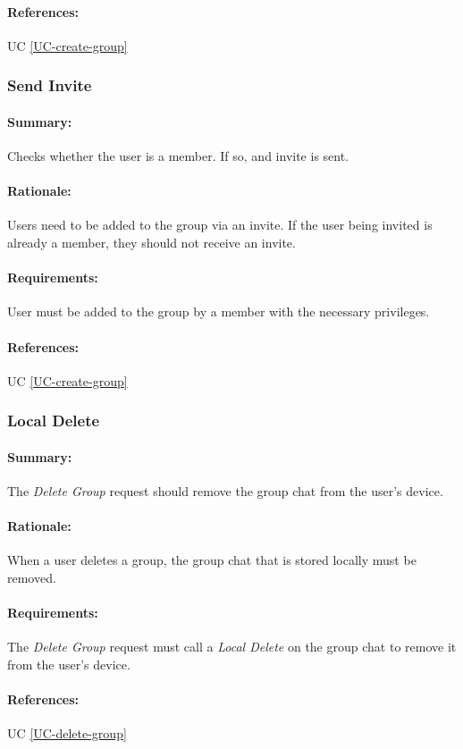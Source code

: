 \documentclass[11pt]{article}
\begin{document}
\paragraph{References:} UC \ref{UC-create-group}

\subsubsection{Send Invite} \label{FR-invite}
\paragraph{Summary:} Checks whether the user is a member. If so, and invite is sent.
\paragraph{Rationale:} Users need to be added to the group via an invite. If the user being invited is already a member, they should not receive an invite.
\paragraph{Requirements:} User must be added to the group by a member with the necessary privileges.
\paragraph{References:} UC \ref{UC-create-group}
 
 \subsubsection{Local Delete} \label{FR-Local-Delete}
 \paragraph{Summary:} The \textit{Delete Group} request should remove the group chat from the user's device.
 \paragraph{Rationale:} When a user deletes a group, the group chat that is stored locally must be removed.
 \paragraph{Requirements:} The \textit{Delete Group} request must call a \textit{Local Delete} on the group chat to remove it from the user's device.
 \paragraph{References:} UC \ref{UC-delete-group}
 
\end{document}
